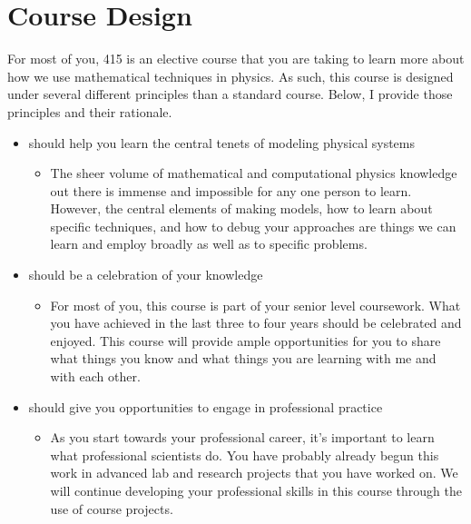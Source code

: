 \documentclass[letterpaper,10pt,english]{jupyterBook}
\begin{document}
\section{Course Design}
\label{\detokenize{content/0_course/2_design:course-design}}\label{\detokenize{content/0_course/2_design::doc}}
\sphinxAtStartPar
For most of you, 415 is an elective course that you are taking to learn more about how we use mathematical techniques in physics. As such, this course is designed under several different principles than a standard course. Below, I provide those principles and their rationale.
\begin{itemize}
\item {} 
 should help you learn the central tenets of modeling physical systems
\begin{itemize}
\item {} 
\sphinxAtStartPar
The sheer volume of mathematical and computational physics knowledge out there is immense and impossible for any one person to learn. However, the central elements of making models, how to learn about specific techniques, and how to debug your approaches are things we can learn and employ broadly as well as to specific problems.

\end{itemize}

\item {} 
 should be a celebration of your knowledge
\begin{itemize}
\item {} 
\sphinxAtStartPar
For most of you, this course is part of your senior level coursework. What you have achieved in the last three to four years should be celebrated and enjoyed. This course will provide ample opportunities for you to share what things you know and what things you are learning with me and with each other.

\end{itemize}

\item {} 
 should give you opportunities to engage in professional practice
\begin{itemize}
\item {} 
\sphinxAtStartPar
As you start towards your professional career, it’s important to learn what professional scientists do. You have probably already begun this work in advanced lab and research projects that you have worked on. We will continue developing your professional skills in this course through the use of course projects.


\end{itemize}
\end{itemize}
\end{document}
